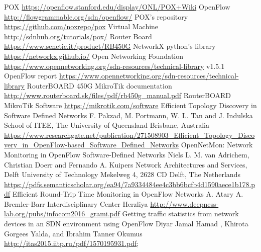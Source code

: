 \documentclass[article,10pt]{IEEEtran}
\begin{document}
\begin{thebibliography}{99}
	 POX \url{https://openflow.stanford.edu/display/ONL/POX+Wiki}
	 OpenFlow \url{http://flowgrammable.org/sdn/openflow/}
	 POX's repository \url{https://github.com/noxrepo/pox}
	 Virtual Machine \url{http://sdnhub.org/tutorials/pox/}
	 Router Board \url{https://www.senetic.it/product/RB450G}
	 NetworkX python's library \url{https://networkx.github.io/}
	 Open Networking Foundation \url{https://www.opennetworking.org/sdn-resources/technical-library}
	 v1.5.1 OpenFlow report \url{https://www.opennetworking.org/sdn-resources/technical-library}
	 RouterBOARD 450G MikroTik documentation \url{http://www.routerboard.sk/files/pdf/rb450g_manual.pdf}
	 RouterBOARD MikroTik Software \url{https://mikrotik.com/software}
	  Efficient Topology Discovery in Software Defined Networks F. Pakzad, M. Portmann, W. L. Tan and J. Indulska
	School of ITEE, The University of Queensland Brisbane, Australia \url{https://www.researchgate.net/publication/271508903_Efficient_Topology_Discovery_in_OpenFlow-based_Software_Defined_Networks}
	 OpenNetMon: Network Monitoring in OpenFlow Software-Defined Networks Niels L.
	M. van Adrichem, Christian Doerr and Fernando A. Kuipers Network Architectures and Services, Delft University of Technology
	Mekelweg 4, 2628 CD Delft, The Netherlands \url{https://pdfs.semanticscholar.org/ea94/7a9334484ee4c3bb6bcfb4d1590aece1b178.pdf}
	 Efficient Round-Trip Time Monitoring in OpenFlow Networks A. Atary A. Bremler-Barr Interdisciplinary Center Herzliya \url{http://www.deepness-lab.org/pubs/infocom2016_grami.pdf}
	 Getting traffic statistics from network devices in an SDN environment using OpenFlow Diyar Jamal Hamad , Khirota Gorgees Yalda, and Ibrahim Tanner Okumus
	\url{http://itas2015.iitp.ru/pdf/1570195931.pdf};
	

	\end{thebibliography}
\end{document}
